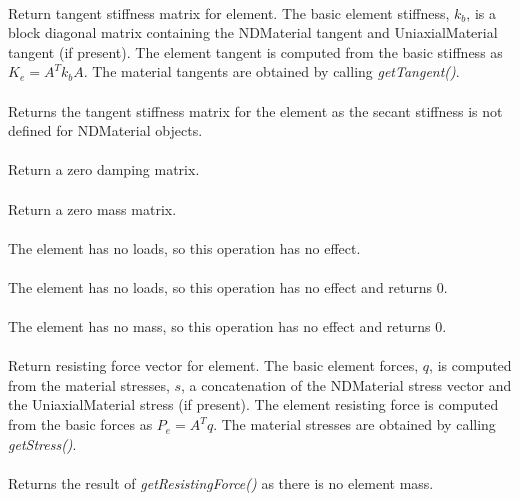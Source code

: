  \\
Return tangent stiffness matrix for element.  The basic element stiffness,
$k_b$, is a block diagonal matrix containing the NDMaterial tangent and
UniaxialMaterial tangent (if present). The element tangent is computed from
the basic stiffness as $K_e = A^T k_b A$.  The material tangents are 
obtained by calling {\em getTangent()}.
\\

 \\    
Returns the tangent stiffness matrix for the element as the secant stiffness
is not defined for NDMaterial objects.
\\

 \\    
Return a zero damping matrix.
\\

 \\    
Return a zero mass matrix.
\\

 \\	
The element has no loads, so this operation has no effect.
\\

 \\
The element has no loads, so this operation has no effect and returns 0.
\\

 \\    
The element has no mass, so this operation has no effect and returns 0.
\\

 \\
Return resisting force vector for element.  The basic element forces, $q$,
is computed from the material stresses, $s$, a concatenation of the
NDMaterial stress vector and the UniaxialMaterial stress (if present). The
element resisting force is computed from the basic forces as $P_e = A^T q$. 
The material stresses are obtained by calling {\em getStress()}.
\\

 \\            
Returns the result of {\em getResistingForce()} as there is no element mass.
\\

